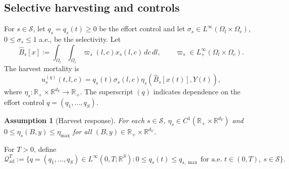 \documentclass[pdflatex,sn-mathphys-num]{sn-jnl}%
\newtheorem{assumption}[theorem]{Assumption}
\begin{document}
\subsection{Selective harvesting and controls}
For \(s\in\mathcal S\), let \(q_s=q_s(t)\ge 0\) be the effort control and let
\(\sigma_s\in L^\infty(\Omega_l\times\Omega_c)\),
\(0\le \sigma_s\le 1\) a.e.,
be the selectivity.
Let
\begin{equation}\label{eq:model_perceived_biomass}
\widehat B_s[x]
:=
\int_{\Omega_l}\int_{\Omega_c}
\varpi_s(l,c)x_s(l,c)\,dc\,dl,
\qquad
\varpi_s\in L^\infty_+(\Omega_l\times\Omega_c).
\end{equation}
The harvest mortality is
\begin{equation}\label{eq:model_harvest_mortality}
u_s^{(q)}(t,l,c)
=
q_s(t)\sigma_s(l,c)\eta_s(\widehat B_s[x(t)],Y(t)),
\end{equation}
where
\(\eta_s:\mathbb R_+\times\mathbb R^{d_Y}\to\mathbb R_+\).
The superscript \((q)\) indicates dependence on the effort control
\(q=(q_1,\dots,q_S)\).

\begin{assumption}[Harvest response]\label{ass:model_harvest_response}
For each \(s\in\mathcal S\),
\(\eta_s\in C^1(\mathbb R_+\times\mathbb R^{d_Y})\) and
\(0\le \eta_s(B,y)\le \eta_{\max}\)
for all \((B,y)\in\mathbb R_+\times\mathbb R^{d_Y}\).
\end{assumption}
For \(T>0\), define
\begin{equation}\label{eq:model_admissible_controls}
\mathcal Q_{\mathrm{ad}}^T
:=
\Big\{
q=(q_1,\dots,q_S)\in L^\infty(0,T;\mathbb R^S):
0\le q_s(t)\le q_{s,\max}\ \text{for a.e. }t\in(0,T),\ s\in\mathcal S
\Big\}.
\end{equation}
\end{document}
